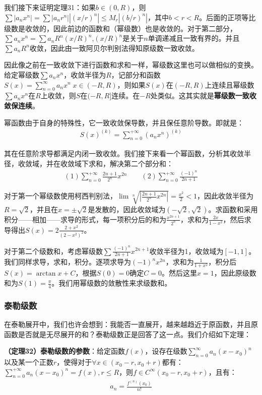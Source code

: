 \documentclass{ctexart}
\let\oldtextbf\textbf
\renewcommand{\textbf}[1]{\textcolor{brown!50!red}{\oldtextbf{#1}}}
\begin{document}
我们接下来证明定理31：如果$b\in(0,R)$，则$\sum |a_nx^n|=\sum|a_n r^n||(x/r)^n|\leq M_r|(b/r)^n|$，其中$b<r<R$。后面的正项等比级数是收敛的，因此前边的函数和（幂级数）也是收敛的。对于第二部分，$\sum a_nx^n=\sum a_n R^n(x/R)^n$,$(x/R)^n$是关于$n$单调递减且一致有界的。并且$\sum a_n R^n$收敛，因此由一致阿贝尔判别法得知原级数一致收敛。

因此像之前在一致收敛下进行函数和求和一样，幂级数这里也可以做相似的变换。给定幂级数$\sum a_nx^n$，收敛半径为$R$，记部分和函数$S(x)=\sum_{n=0}^\infty a_nx^n\; x\in(-R,R)$，则如果$S(x)$在$(-R,R)$上连续且幂级数$\sum a_nx^n$在$R$上收敛，则$S$在$(-R,R]$连续。在$-R$处类似。这其实就是\textbf{\color{brown!50!red}幂级数一致收敛保连续}。

幂函数由于自身的特殊性，它一致收敛保导数，并且保任意阶导数。即就是：
\begin{align*}
    S(x)^{(k)}=\sum_{n=0}^{+\infty}(a_nx^n)^{(k)}
\end{align*}

其在任意阶求导都满足内闭一致收敛。我们接下来看一个幂函数，分析其收敛半径，收敛域，并在收敛域下求和，解决第二个部分和：
\begin{align*}
    (1)\sum_{n=0}^{+\infty}\frac{2n+1}{2^n}x^{2n}  \qquad (2)\sum_{n=0}^{+\infty}\frac{(-1)^n}{2n+1}  
\end{align*}

对于第一个幂级数使用柯西判别法，$\lim \sqrt[n]{|\frac{2n+1}{2^n}x^{2n}|}=\frac{x^2}{2}<1$，因此收敛半径为$R=\sqrt{2}$，并且在$x=\pm \sqrt{2}$是发散的，因此收敛域为$(-\sqrt{2},\sqrt{2})$。求函数和采用积分——相加——求导的形式，每一项积分后的和为$\frac{x^{2n+1}}{2^n}$，求和为$\frac{2x}{1-x^2}$，然后求导得出$S(x)=2\frac{2+x^2}{(2-x^2)^2}$。

对于第二个级数和，考虑幂级数$\sum \frac{(-1)^n}{2n+1}x^{2n+1}$收敛半径为1，收敛域为$[-1,1]$。我们同样求导，求和，积分。逐项求导为$(-1)^n x^{2n}$，求和为$\frac{1}{1+x^2}$，积分后$S(x)=\arctan x+C$，根据$S(0)=0$确定$C=0$。然后这里$x=1$，因此原级数和为$S(1)=\frac{\pi}{4}$。我们用幂级数的敛散性来求级数和。

\subsubsection{泰勒级数}
在泰勒展开中，我们也许会想到：我能否一直展开，越来越趋近于原函数，并且原函数是否就是无尽展开的和？泰勒级数正是回答了这一点。我们介绍如下定理：

\begin{tcolorbox}[
    colback=bac2,     %
    colframe=fra2,   %
    coltitle=white,             %
    coltext=tex2,
    title=泰勒级数的参数,
    fonttitle=\bfseries,        %
arc=3mm,                     %
breakable
]

\textbf{\color{brown!50!red}（定理32）泰勒级数的参数}：给定函数$f(x)$，设存在级数$\sum_{n=0}^\infty a_n(x-x_0)^n$以及某一个正数$r$，使得对于$\forall x\in(x_0-r,x_0+r)$都有：$\sum_{n=0}^{+\infty} a_n(x-x_0)^n=f(x),r\leq R$，则$f\in C^\infty (x_0-r,x_0+r)$，且有：
\begin{align*}
    a_n=\frac{f^{(n)}(x_0)}{n!} 
\end{align*}
\end{tcolorbox}
\end{document}
